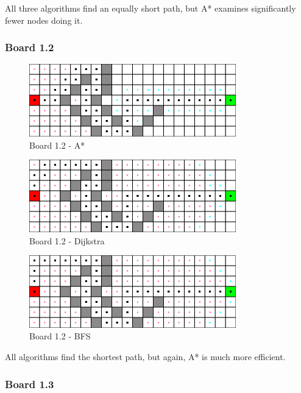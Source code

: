 All three algorithms find an equally short path, but A* examines significantly
fewer nodes doing it.

\clearpage

\subsubsection*{Board 1.2}

\begin{figure}[h!]
  \centering
    \includegraphics[width=0.8\textwidth]{img/board-1-2-astar}
    \caption{Board 1.2 - A*}
\end{figure}

\begin{figure}[h!]
  \centering
    \includegraphics[width=0.8\textwidth]{img/board-1-2-dijkstra}
    \caption{Board 1.2 - Dijkstra}
\end{figure}

\begin{figure}[h!]
  \centering
    \includegraphics[width=0.8\textwidth]{img/board-1-2-bfs}
    \caption{Board 1.2 - BFS}
\end{figure}

All algorithms find the shortest path, but again, A* is much more efficient.

\clearpage

\subsubsection*{Board 1.3}

